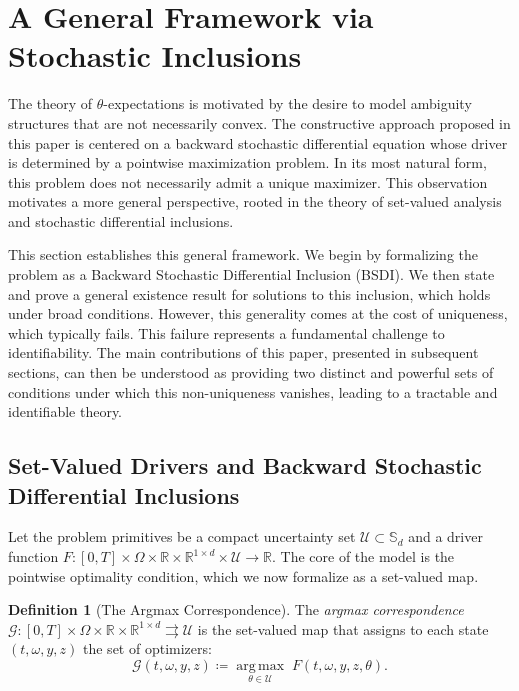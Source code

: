 \documentclass[12pt, letterpaper]{amsart}
\newcommand{\Ucal}{\mathcal{U}}
\newcommand{\Sd}{\mathbb{S}_d}
\newcommand{\R}{\mathbb{R}}
\DeclareMathOperator*{\argmax}{arg\,max}
\theoremstyle{plain}
\theoremstyle{definition}
\newtheorem{definition}[theorem]{Definition}
\theoremstyle{remark}
\numberwithin{equation}{section} %
\begin{document}
\section{A General Framework via Stochastic Inclusions}
\label{sec:inclusion_framework}

The theory of $\theta$-expectations is motivated by the desire to model ambiguity structures that are not necessarily convex. The constructive approach proposed in this paper is centered on a backward stochastic differential equation whose driver is determined by a pointwise maximization problem. In its most natural form, this problem does not necessarily admit a unique maximizer. This observation motivates a more general perspective, rooted in the theory of set-valued analysis and stochastic differential inclusions.

This section establishes this general framework. We begin by formalizing the problem as a Backward Stochastic Differential Inclusion (BSDI). We then state and prove a general existence result for solutions to this inclusion, which holds under broad conditions. However, this generality comes at the cost of uniqueness, which typically fails. This failure represents a fundamental challenge to identifiability. The main contributions of this paper, presented in subsequent sections, can then be understood as providing two distinct and powerful sets of conditions under which this non-uniqueness vanishes, leading to a tractable and identifiable theory.

\subsection{Set-Valued Drivers and Backward Stochastic Differential Inclusions}

Let the problem primitives be a compact uncertainty set $\Ucal \subset \Sd$ and a driver function $F: [0,T] \times \Omega \times \R \times \R^{1\times d} \times \Ucal \to \R$. The core of the model is the pointwise optimality condition, which we now formalize as a set-valued map.

\begin{definition}[The Argmax Correspondence]
The \emph{argmax correspondence} $\mathcal{G}: [0,T] \times \Omega \times \R \times \R^{1\times d} \rightrightarrows \Ucal$ is the set-valued map that assigns to each state $(t, \omega, y, z)$ the set of optimizers:
\begin{equation}
    \mathcal{G}(t, \omega, y, z) \coloneqq \underset{\theta \in \Ucal}{\argmax} \; F(t, \omega, y, z, \theta).
\end{equation}
\end{definition}
\end{document}
